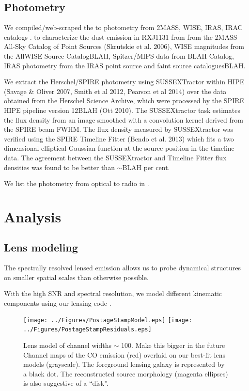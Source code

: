 \documentclass[]{emulateapj}
\begin{document}
\subsection{Photometry}
We compiled/web-scraped the \mir to \fir photometry
from 2MASS, WISE, IRAS, IRAC catalogs .
to characterize
the dust emission in RXJ1131 from
from the 2MASS All-Sky Catalog of Point Sources  (Skrutskie et al. 2006), WISE
magnitudes from the AllWISE Source CatalogBLAH, Spitzer/MIPS
data from BLAH Catalog, IRAS photometry from the IRAS point source
and faint source cataloguesBLAH.

We extract the Herschel/SPIRE photometry using SUSSEXTractor
within HIPE (Savage \& Oliver 2007, Smith et al 2012, Pearson et al 2014)
over the data obtained from the Herschel Science Archive, which were
processed by the SPIRE HIPE pipeline version 12BLAH (Ott 2010).
The SUSSEXtractor
task estimates the flux density from an image smoothed with
a convolution kernel derived from the SPIRE beam FWHM.
The flux density measured by SUSSEXtractor
was verified using the SPIRE Timeline Fitter (Bendo et
al. 2013) which fits a two dimensional elliptical Gaussian
function at the source position in the timeline data. The
agreement between the SUSSEXtractor and Timeline Fitter
flux densities was found to be better than $\sim$BLAH per cent.

We list the photometry from optical to radio in .



\section{Analysis}
\subsection{Lens modeling} \label{lensmodel}
The spectrally resolved lensed emission allows us to probe dynamical structures on smaller spatial scales than otherwise possible.


With the high SNR and spectral resolution, we model different kinematic components using our lensing code \uvmcmcfit.





\begin{figure}[tbph]
\centering
\texttt{[image: ../Figures/PostageStampModel.eps]}
\texttt{[image: ../Figures/PostageStampResiduals.eps]}
\caption{
Lens model of channel widths $\sim$ 100\kms.
Make this bigger in the future
Channel maps of the CO emission (red) overlaid on our best-fit lens models (grayscale). The foreground lensing galaxy is represented by a black dot. The reconstructed source morphology (magenta ellipses) is also suggestive of a “disk”.
\label{fig:model}}
\end{figure}
\end{document}
